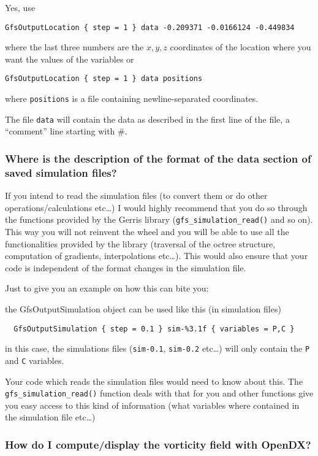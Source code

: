 \documentclass[a4paper]{article}
\begin{document}
Yes, use
\begin{verbatim}
GfsOutputLocation { step = 1 } data -0.209371 -0.0166124 -0.449834
\end{verbatim}
where the last three numbers are the $x,y,z$ coordinates of the location
where you want the values of the variables or
\begin{verbatim}
GfsOutputLocation { step = 1 } data positions
\end{verbatim}
where {\tt positions} is a file containing newline-separated coordinates.

The file {\tt data} will contain the data as described in the first line of the file, a ``comment'' line starting with \#.

\subsubsection{Where is the description of the format of the data 
section of saved simulation files?}

If you intend to read the simulation files (to convert them or do
other operations/calculations etc\dots) I would highly recommend that
you do so through the functions provided by the Gerris library
({\tt gfs\_simulation\_read()} and so on). This way you will not reinvent the
wheel and you will be able to use all the functionalities provided by
the library (traversal of the octree structure, computation of
gradients, interpolations etc\dots). This would also ensure that your
code is independent of the format changes in the simulation file.

Just to give you an example on how this can bite you:

the GfsOutputSimulation object can be used like this (in simulation
files)
\begin{verbatim}
  GfsOutputSimulation { step = 0.1 } sim-%3.1f { variables = P,C }
\end{verbatim}
in this case, the simulations files ({\tt sim-0.1}, {\tt sim-0.2} etc\dots) will
only contain the {\tt P} and {\tt C} variables.

Your code which reads the simulation files would need to know about
this. The {\tt gfs\_simulation\_read()} function deals with that for you and
other functions give you easy access to this kind of information (what
variables where contained in the simulation file etc\dots)

\subsubsection{How do I compute/display the vorticity field with OpenDX?}
\end{document}
